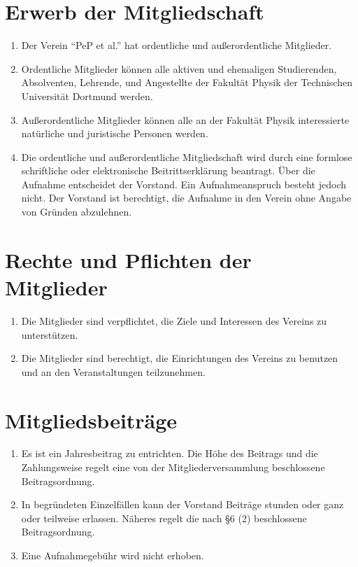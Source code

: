 \documentclass[
  fontsize=12pt,
  paper=a4,
  DIV14,
  parskip,
]{scrartcl}
\begin{document}
\section{Erwerb der Mitgliedschaft}

\begin{enumerate}
	\item Der Verein \enquote{PeP et al.} hat ordentliche und
		außerordentliche Mitglieder.
	\item Ordentliche Mitglieder können alle aktiven und ehemaligen Studierenden,
		Absolventen, Lehrende, und Angestellte der Fakultät Physik der Technischen
		Universität Dortmund werden.
	\item Außerordentliche Mitglieder können alle an der Fakultät Physik
		interessierte natürliche und juristische Personen werden.
	\item Die ordentliche und außerordentliche Mitgliedschaft wird durch eine
		formlose schriftliche oder elektronische Beitrittserklärung beantragt.
		Über die Aufnahme entscheidet der Vorstand. Ein Aufnahmeanspruch besteht
		jedoch nicht. Der Vorstand ist berechtigt, die Aufnahme in den Verein ohne
		Angabe von Gründen abzulehnen.
\end{enumerate}

\section{Rechte und Pflichten der Mitglieder}

\begin{enumerate}
	\item Die Mitglieder sind verpflichtet, die Ziele und Interessen des
		Vereins zu unterstützen.
	\item Die Mitglieder sind berechtigt, die Einrichtungen des Vereins zu
		benutzen und an den Veranstaltungen teilzunehmen.
\end{enumerate}

\section{Mitgliedsbeiträge}

\begin{enumerate}
	\item Es ist ein Jahresbeitrag zu entrichten. Die Höhe des Beitrags und
		die Zahlungsweise regelt eine von der Mitgliederversammlung beschlossene
		Beitragsordnung.
	\item In begründeten Einzelfällen kann der Vorstand Beiträge stunden oder
		ganz oder teilweise erlassen. Näheres regelt die nach §6 (2) beschlossene
		Beitragsordnung.
	\item Eine Aufnahmegebühr wird nicht erhoben.
\end{enumerate}
\end{document}
